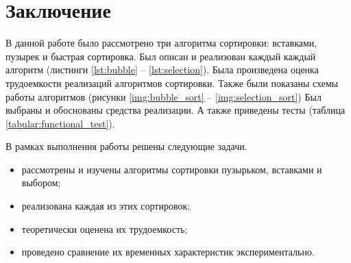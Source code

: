 \section*{Заключение}

В данной работе было рассмотрено три алгоритма сортировки: вставками, пузырек и быстрая сортировка.
Был описан и реализован каждый каждый алгоритм (листинги \ref{lst:bubble} -- \ref{lst:selection}). Была произведена оценка трудоемкости реализаций алгоритмов сортировки.
Также были показаны схемы работы алгоритмов (рисунки \ref{img:bubble_sort} -- \ref{img:selection_sort}) 
Был выбраны и обоснованы средства реализации. 
А также приведены тесты (таблица \ref{tabular:functional_test}).


В рамках выполнения работы решены следующие задачи.
\begin{itemize}
	\item рассмотрены и изучены алгоритмы сортировки пузырьком, вставками и выбором;
	\item реализована каждая из этих сортировок;
	\item теоретически оценена их трудоемкость;
	\item проведено сравнение их временных характеристик экспериментально.
\end{itemize}
